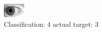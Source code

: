 \begin{figure}[h!]
\begin{center}
\includegraphics[width=0.60\columnwidth]{figures/ID277_class_4_target_3.png}
\end{center}
\caption{ Classification: 4 actual target: 3}
\label{fig:ID277_class_4_target_3}
\end{figure}
